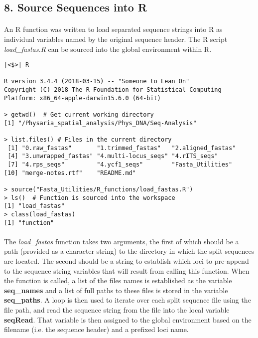 \clearpage

\subsection*{8. Source Sequences into R}

\paragraph{} An R function was written to load separated sequence strings into R as individual variables named by the original sequence header.  The R script \textit{load\_fastas.R} can be sourced into the global environment within R.  

\vspace*{30pt}

\begin{lstlisting}[caption=R session info]
|<$>| R

R version 3.4.4 (2018-03-15) -- "Someone to Lean On"
Copyright (C) 2018 The R Foundation for Statistical Computing
Platform: x86_64-apple-darwin15.6.0 (64-bit)

> getwd()  # Get current working directory
[1] "/Physaria_spatial_analysis/Phys_DNA/Seq-Analysis"

> list.files() # Files in the current directory
 [1] "0.raw_fastas"       "1.trimmed_fastas"   "2.aligned_fastas"  
 [4] "3.unwrapped_fastas" "4.multi-locus_seqs" "4.rITS_seqs"       
 [7] "4.rps_seqs"         "4.ycf1_seqs"        "Fasta_Utilities"   
[10] "merge-notes.rtf"    "README.md"        

> source("Fasta_Utilities/R_functions/load_fastas.R")
> ls()  # Function is sourced into the workspace
[1] "load_fastas"
> class(load_fastas)
[1] "function"
\end{lstlisting}

\clearpage

\paragraph{} The \textit{load\_fastas} function takes two arguments, the first of which should be a path (provided as a character string) to the directory in which the split sequences are located. The second should be a string to establish which loci to pre-append to the sequence string variables that will result from calling this function.  When the function is called, a list of the files names is established as the variable \textbf{seq\_names} and a list of full paths to these files is stored in the variable \textbf{seq\_paths}.  A loop is then used to iterate over each split sequence file using the file path, and read the sequence string from the file into the local variable \textbf{seqRead}.  That variable is then assigned to the global environment based on the filename (i.e. the sequence header) and a prefixed loci name.

